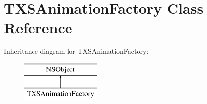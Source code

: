 \hypertarget{interface_t_x_s_animation_factory}{}\section{T\+X\+S\+Animation\+Factory Class Reference}
\label{interface_t_x_s_animation_factory}
Inheritance diagram for T\+X\+S\+Animation\+Factory\+:\begin{figure}[H]
\begin{center}
\leavevmode
\includegraphics[height=2.000000cm]{interface_t_x_s_animation_factory}
\end{center}
\end{figure}
